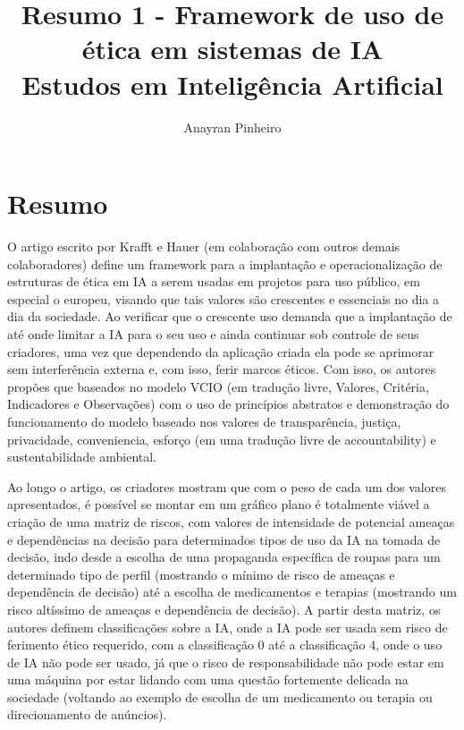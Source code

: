 \documentclass{article}
\title{Resumo 1 - Framework de uso de ética em sistemas de IA   \\ \small Estudos em Inteligência Artificial}
\author{Anayran Pinheiro}
\begin{document}
\maketitle

\section{Resumo}

O artigo escrito por Krafft e Hauer (em colaboração com outros demais colaboradores) define um framework para a implantação e operacionalização de estruturas de ética em IA a serem usadas em projetos para uso público, em especial o europeu, visando que tais valores são crescentes e essenciais no dia a dia da sociedade. Ao verificar que o crescente uso demanda que a implantação de até onde limitar a IA para o seu uso e ainda continuar sob controle de seus criadores, uma vez que dependendo da aplicação criada ela pode se aprimorar sem interferência externa e, com isso, ferir marcos éticos. Com isso, os autores propões que baseados no modelo VCIO (em tradução livre, Valores, Critéria, Indicadores e Observações) com o uso de princípios abstratos e demonstração do funcionamento do modelo baseado nos valores de transparência, justiça, privacidade, conveniencia, esforço (em uma tradução livre de accountability) e sustentabilidade ambiental.

Ao longo o artigo, os criadores mostram que com o peso de cada um dos valores apresentados, é possível se montar em um gráfico plano é totalmente viável a criação de uma matriz de riscos, com valores de intensidade de potencial ameaças e dependências na decisão para determinados tipos de uso da IA na tomada de decisão, indo desde a escolha de uma propaganda específica de roupas para um determinado tipo de perfil (mostrando o mínimo de risco de ameaças e dependência de decisão) até a escolha de medicamentos e terapias (mostrando um risco altíssimo de ameaças e dependência de decisão). A partir desta matriz, os autores definem classificações sobre a IA, onde a IA pode ser usada sem risco de ferimento ético requerido, com a classificação 0 até a classificação 4, onde o uso de IA não pode ser usado, já que o risco de responsabilidade não pode estar em uma máquina por estar lidando com uma questão fortemente delicada na sociedade (voltando ao exemplo de escolha de um medicamento ou terapia ou direcionamento de anúncios).
\end{document}
